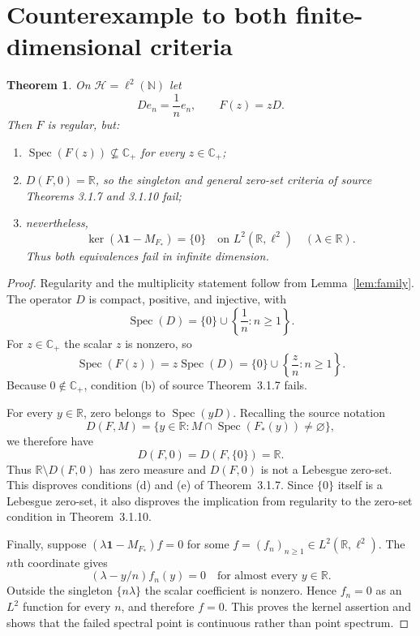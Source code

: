 \documentclass[11pt]{article}
\newtheorem{theorem}{Theorem}
\newcommand{\Cplus}{\mathbb C_+}
\newcommand{\spec}{\operatorname{Spec}}
\begin{document}
\section{Counterexample to both finite-dimensional criteria}

\begin{theorem}\label{thm:counterexample}
On $\mathcal H=\ell^2(\mathbb N)$ let
\[
 De_n=\frac1n e_n,\qquad F(z)=zD.
\]
Then $F$ is regular, but:
\begin{enumerate}
\item $\spec(F(z))\not\subseteq\Cplus$ for every $z\in\Cplus$;
\item $D(F,0)=\mathbb R$, so the singleton and general zero-set criteria of
  source Theorems 3.1.7 and 3.1.10 fail;
\item nevertheless,
\[
 \ker(\lambda\mathbf1-M_{F_*})=\{0\}
 \quad\text{on }L^2(\mathbb R,\ell^2)
 \quad(\lambda\in\mathbb R).
\]
Thus both equivalences fail in infinite dimension.
\end{enumerate}
\end{theorem}

\begin{proof}
Regularity and the multiplicity statement follow from
Lemma~\ref{lem:family}.  The operator $D$ is compact, positive, and injective,
with
\[
 \spec(D)=\{0\}\cup\left\{\frac1n:n\geq1\right\}.
\]
For $z\in\Cplus$ the scalar $z$ is nonzero, so
\[
 \spec(F(z))=z\spec(D)
 =\{0\}\cup\left\{\frac zn:n\geq1\right\}.
\]
Because $0\notin\Cplus$, condition (b) of source Theorem~3.1.7 fails.

For every $y\in\mathbb R$, zero belongs to $\spec(yD)$.  Recalling the source
notation
\[
 D(F,M)=\{y\in\mathbb R:M\cap\spec(F_*(y))\neq\varnothing\},
\]
we therefore have
\[
 D(F,0)=D(F,\{0\})=\mathbb R.
\]
Thus $\mathbb R\setminus D(F,0)$ has zero measure and $D(F,0)$ is not a
Lebesgue zero-set.  This disproves conditions (d) and (e) of Theorem~3.1.7.
Since $\{0\}$ itself is a Lebesgue zero-set, it also disproves the implication
from regularity to the zero-set condition in Theorem~3.1.10.

Finally, suppose $(\lambda\mathbf1-M_{F_*})f=0$ for some
$f=(f_n)_{n\geq1}\in L^2(\mathbb R,\ell^2)$.  The $n$th coordinate gives
\[
  (\lambda-y/n)f_n(y)=0\quad\text{for almost every }y\in\mathbb R.
\]
Outside the singleton $\{n\lambda\}$ the scalar coefficient is nonzero.
Hence $f_n=0$ as an $L^2$ function for every $n$, and therefore $f=0$.
This proves the kernel assertion and shows that the failed spectral point is
continuous rather than point spectrum.
\end{proof}
\end{document}

